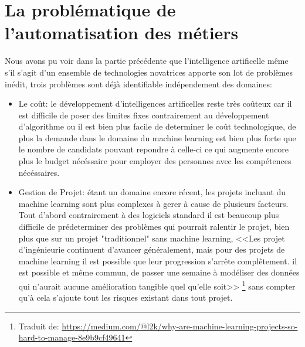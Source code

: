 \newpage
\section{La problématique de l'automatisation des métiers}
    Nous avons pu voir dans la partie précédente que l'intelligence artificelle même s'il s'agit 
    d'un ensemble de technologies novatrices apporte son lot de problèmes inédit, 
    trois problèmes sont déjà identifiable indépendement des domaines: \newline 
    
    \begin{itemize}
        \item Le coût: le développement d'intelligences artificelles reste très coûteux car il est difficile 
            de poser des limites fixes contrairement au développement d'algorithme ou il est bien plus facile 
            de determiner le coût technologique, de plus la demande dans le domaine du machine learning est 
            bien plus forte que le nombre de candidats pouvant repondre à celle-ci ce qui augmente 
            encore plus le budget nécéssaire pour employer des personnes avec les compétences 
            nécéssaires.
            \newline

        \item Gestion de Projet: étant un domaine encore récent, les projets incluant 
            du machine learning sont plus complexes à gerer à cause de plusieurs 
            facteurs. Tout d'abord contrairement à des logiciels standard il est beaucoup 
            plus difficile de prédeterminer des problèmes qui pourrait ralentir le projet,
            bien plus que sur un projet "traditionnel" sans machine learning,
            <<Les projet d'ingénieurie continuent d'avancer généralement, mais pour des projets 
            de machine learning il est possible que leur progression s'arrête complêtement.
            il est possible et même commun, de passer une semaine à modéliser des données 
            qui n'aurait aucune amélioration tangible quel qu'elle soit>>
            \footnote{Traduit de: \url{https://medium.com/@l2k/why-are-machine-learning-projects-so-hard-to-manage-8e9b9cf49641}}
            sans compter qu'à cela s'ajoute tout les risques existant dans tout projet.
            \newline 


\end{itemize}

